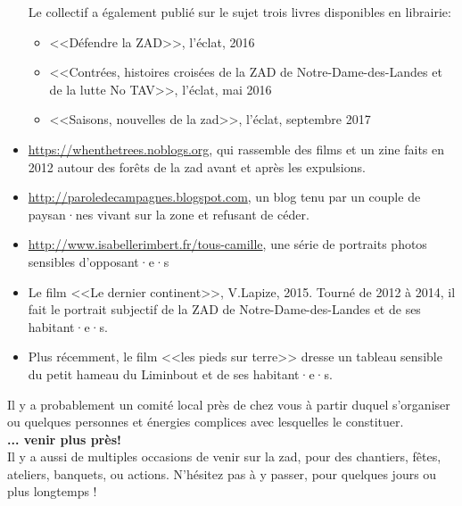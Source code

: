 \begin{itemize}[leftmargin=*]
Le collectif a également publié sur le sujet trois livres disponibles en librairie:
\begin{itemize}[label=$\cdot$] 
\item <<Défendre la ZAD>>, l'éclat, 2016
\item <<Contrées, histoires croisées de la ZAD de Notre-Dame-des-Landes et de la lutte No TAV>>, l'éclat, mai 2016
\item <<Saisons, nouvelles de la zad>>, l'éclat, septembre 2017
\end{itemize}
\item \url{https://whenthetrees.noblogs.org},  qui rassemble des films et un zine faits en 2012 autour des forêts de la zad avant et après les expulsions.
\item \url{http://paroledecampagnes.blogspot.com}, un blog tenu par un couple de paysan·nes vivant sur la zone et refusant de céder.
\item \url{http://www.isabellerimbert.fr/tous-camille}, une série de portraits photos sensibles d'opposant·e·s
\item Le film <<Le dernier continent>>, V.Lapize, 2015. Tourné de 2012 à 2014, il fait le portrait subjectif de la ZAD de Notre-Dame-des-Landes et de ses habitant·e·s.
\item Plus récemment, le film <<les pieds sur terre>> dresse un tableau sensible du petit hameau du Liminbout et de ses habitant·e·s. 
\end{itemize}

Il y a probablement un comité local près de chez vous à partir duquel s'organiser ou quelques personnes et énergies complices avec lesquelles le constituer.\\

\textbf{... venir plus près! }\\

Il y a aussi de multiples occasions de venir sur la zad, pour des chantiers, fêtes, ateliers, banquets, ou actions. N'hésitez pas à y passer, pour quelques jours ou plus longtemps !